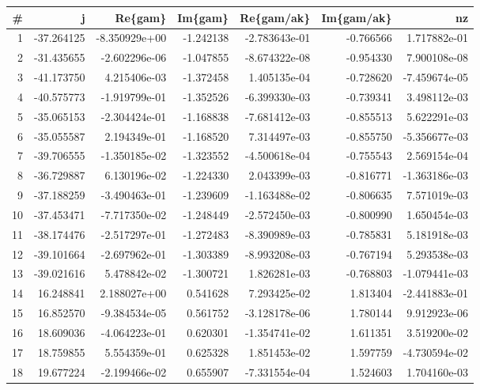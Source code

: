 \begin{tabular}{rrrrrrr}
\toprule
 \# &          j &       Re\{gam\} &   Im\{gam\} &    Re\{gam/ak\} &  Im\{gam/ak\} &            nz \\
\midrule
 1 & -37.264125 & -8.350929e+00 & -1.242138 & -2.783643e-01 &   -0.766566 &  1.717882e-01 \\
 2 & -31.435655 & -2.602296e-06 & -1.047855 & -8.674322e-08 &   -0.954330 &  7.900108e-08 \\
 3 & -41.173750 &  4.215406e-03 & -1.372458 &  1.405135e-04 &   -0.728620 & -7.459674e-05 \\
 4 & -40.575773 & -1.919799e-01 & -1.352526 & -6.399330e-03 &   -0.739341 &  3.498112e-03 \\
 5 & -35.065153 & -2.304424e-01 & -1.168838 & -7.681412e-03 &   -0.855513 &  5.622291e-03 \\
 6 & -35.055587 &  2.194349e-01 & -1.168520 &  7.314497e-03 &   -0.855750 & -5.356677e-03 \\
 7 & -39.706555 & -1.350185e-02 & -1.323552 & -4.500618e-04 &   -0.755543 &  2.569154e-04 \\
 8 & -36.729887 &  6.130196e-02 & -1.224330 &  2.043399e-03 &   -0.816771 & -1.363186e-03 \\
 9 & -37.188259 & -3.490463e-01 & -1.239609 & -1.163488e-02 &   -0.806635 &  7.571019e-03 \\
10 & -37.453471 & -7.717350e-02 & -1.248449 & -2.572450e-03 &   -0.800990 &  1.650454e-03 \\
11 & -38.174476 & -2.517297e-01 & -1.272483 & -8.390989e-03 &   -0.785831 &  5.181918e-03 \\
12 & -39.101664 & -2.697962e-01 & -1.303389 & -8.993208e-03 &   -0.767194 &  5.293538e-03 \\
13 & -39.021616 &  5.478842e-02 & -1.300721 &  1.826281e-03 &   -0.768803 & -1.079441e-03 \\
14 &  16.248841 &  2.188027e+00 &  0.541628 &  7.293425e-02 &    1.813404 & -2.441883e-01 \\
15 &  16.852570 & -9.384534e-05 &  0.561752 & -3.128178e-06 &    1.780144 &  9.912923e-06 \\
16 &  18.609036 & -4.064223e-01 &  0.620301 & -1.354741e-02 &    1.611351 &  3.519200e-02 \\
17 &  18.759855 &  5.554359e-01 &  0.625328 &  1.851453e-02 &    1.597759 & -4.730594e-02 \\
18 &  19.677224 & -2.199466e-02 &  0.655907 & -7.331554e-04 &    1.524603 &  1.704160e-03 \\

\end{tabular}
